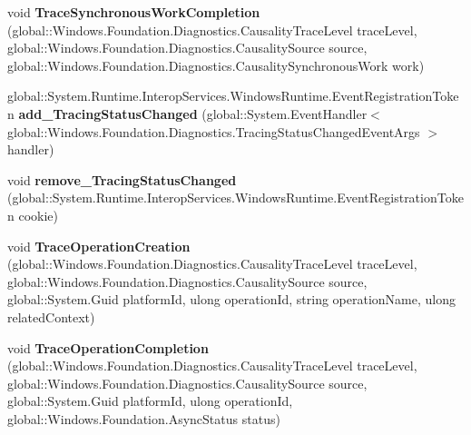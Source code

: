 \begin{DoxyCompactItemize}
void {\bfseries Trace\+Synchronous\+Work\+Completion} (global\+::\+Windows.\+Foundation.\+Diagnostics.\+Causality\+Trace\+Level trace\+Level, global\+::\+Windows.\+Foundation.\+Diagnostics.\+Causality\+Source source, global\+::\+Windows.\+Foundation.\+Diagnostics.\+Causality\+Synchronous\+Work work)
\item 
\mbox{\label{interface_windows_1_1_foundation_1_1_diagnostics_1_1_i_async_causality_tracer_statics_adecd1f58d29fb341c2489d08610ac331}} 
global\+::\+System.\+Runtime.\+Interop\+Services.\+Windows\+Runtime.\+Event\+Registration\+Token {\bfseries add\+\_\+\+Tracing\+Status\+Changed} (global\+::\+System.\+Event\+Handler$<$ global\+::\+Windows.\+Foundation.\+Diagnostics.\+Tracing\+Status\+Changed\+Event\+Args $>$ handler)
\item 
\mbox{\label{interface_windows_1_1_foundation_1_1_diagnostics_1_1_i_async_causality_tracer_statics_a0b28a0699db651012d252a2063f84c0a}} 
void {\bfseries remove\+\_\+\+Tracing\+Status\+Changed} (global\+::\+System.\+Runtime.\+Interop\+Services.\+Windows\+Runtime.\+Event\+Registration\+Token cookie)
\item 
\mbox{\label{interface_windows_1_1_foundation_1_1_diagnostics_1_1_i_async_causality_tracer_statics_a38bdec695d719f8d62636334dcfb8dc5}} 
void {\bfseries Trace\+Operation\+Creation} (global\+::\+Windows.\+Foundation.\+Diagnostics.\+Causality\+Trace\+Level trace\+Level, global\+::\+Windows.\+Foundation.\+Diagnostics.\+Causality\+Source source, global\+::\+System.\+Guid platform\+Id, ulong operation\+Id, string operation\+Name, ulong related\+Context)
\item 
\mbox{\label{interface_windows_1_1_foundation_1_1_diagnostics_1_1_i_async_causality_tracer_statics_ac5e3ac3c90be930394f03ec531d863cd}} 
void {\bfseries Trace\+Operation\+Completion} (global\+::\+Windows.\+Foundation.\+Diagnostics.\+Causality\+Trace\+Level trace\+Level, global\+::\+Windows.\+Foundation.\+Diagnostics.\+Causality\+Source source, global\+::\+System.\+Guid platform\+Id, ulong operation\+Id, global\+::\+Windows.\+Foundation.\+Async\+Status status)

\end{DoxyCompactItemize}
